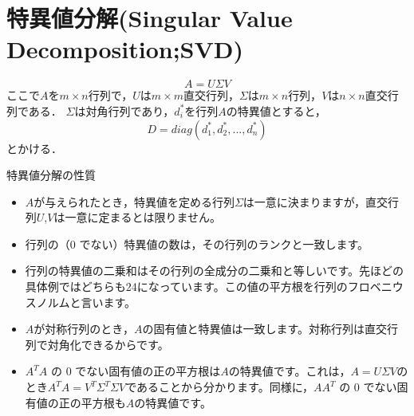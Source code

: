 \documentclass[12pt]{jsarticle}
\begin{document}
\section{特異値分解(Singular Value Decomposition;SVD)}
\begin{equation}
  \label{A=USV}
  A = U \Sigma V
\end{equation}
ここで$A$を$m×n$行列で，$U$は$m×m$直交行列，$\Sigma$は$m×n$行列，$V$は$n×n$直交行列である．
$\Sigma$は対角行列であり，$d_i^*$を行列$A$の特異値とすると，
\begin{equation}
  \label{D_diag}
  D = diag(d_1^*, d_2^*, ..., d_n^*)
\end{equation}
とかける．

特異値分解の性質
\begin{itemize}
  \item $A$が与えられたとき，特異値を定める行列$Σ$は一意に決まりますが，直交行列$U$,$V$は一意に定まるとは限りません。
  \item 行列の（0 でない）特異値の数は，その行列のランクと一致します。
  \item 行列の特異値の二乗和はその行列の全成分の二乗和と等しいです。先ほどの具体例ではどちらも24になっています。この値の平方根を行列のフロベニウスノルムと言います。
  \item $A$が対称行列のとき，$A$の固有値と特異値は一致します。対称行列は直交行列で対角化できるからです。
  \item $A^TA$ の 0 でない固有値の正の平方根は$A$の特異値です。これは，$A=UΣV$のとき$A^TA=V^TΣ^TΣV$であることから分かります。同様に，$AA^T$ の 0 でない固有値の正の平方根も$A$の特異値です。
\end{itemize}
\end{document}
